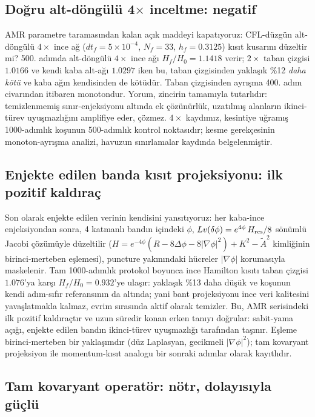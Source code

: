 \subsection{Doğru alt-döngülü 4$\times$ inceltme: negatif}

AMR parametre taramasından kalan açık maddeyi kapatıyoruz: CFL-düzgün
alt-döngülü $4\times$ ince ağ ($dt_f = 5\times10^{-4}$, $N_f = 33$,
$h_f = 0.3125$) kısıt kusarını düzeltir mi? 500. adımda alt-döngülü
$4\times$ ince ağı $H_f/H_0 = 1.1418$ verir; $2\times$ taban çizgisi
$1.0166$ ve kendi kaba alt-ağı $1.0297$ iken bu, taban çizgisinden
yaklaşık \%12 \emph{daha kötü} ve kaba ağın kendisinden de kötüdür.
Taban çizgisinden ayrışma 400. adım civarından itibaren monotondur.
Yorum, zincirin tamamıyla tutarlıdır: temizlenmemiş sınır-enjeksiyonu
altında ek çözünürlük, uzatılmış alanların ikinci-türev uyuşmazlığını
amplifiye eder, çözmez. $4\times$ kaydımız, kesintiye uğramış
1000-adımlık koşunun 500-adımlık kontrol noktasıdır; kesme gerekçesinin
monoton-ayrışma analizi, havuzun sınırlamalar kaydında belgelenmiştir.

\subsection{Enjekte edilen banda kısıt projeksiyonu: ilk pozitif kaldıraç}

Son olarak enjekte edilen verinin kendisini yansıtıyoruz: her
kaba-ince enjeksiyondan sonra, 4 katmanlı bandın içindeki $\phi$,
$Lv(\delta\phi) = e^{4\phi}\,H_{\rm res}/8$ sönümlü Jacobi çözümüyle
düzeltilir
($H = e^{-4\phi}(R - 8\Delta\phi - 8|\nabla\phi|^2) + K^2 - \tilde A^2$
kimliğinin birinci-merteben eşlemesi), puncture yakınındaki hücreler
$|\nabla\phi|$ korumasıyla maskelenir. Tam 1000-adımlık protokol
boyunca ince Hamilton kısıtı taban çizgisi $1.076$'ya karşı
$H_f/H_0 = 0.932$'ye ulaşır: yaklaşık \%13 daha düşük ve koşunun
kendi adım-sıfır referansının da altında; yani bant projeksiyonu
ince veri kalitesini yavaşlatmakla kalmaz, evrim sırasında aktif
olarak temizler. Bu, AMR serisindeki ilk pozitif kaldıraçtır ve
uzun süredir konan erken tanıyı doğrular: sabit-yama açığı,
enjekte edilen bandın ikinci-türev uyuşmazlığı tarafından taşınır.
Eşleme birinci-merteben bir yaklaşımdır (düz Laplasyan,
gecikmeli $|\nabla\phi|^2$); tam kovaryant projeksiyon ile
momentum-kısıt analogu bir sonraki adımlar olarak kayıtlıdır.

\subsection{Tam kovaryant operatör: nötr, dolayısıyla güçlü}

